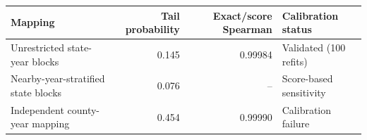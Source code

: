 \begin{tabular}{lrrl}
\toprule
Mapping & Tail probability & Exact/score Spearman & Calibration status \\
\midrule
Unrestricted state-year blocks & 0.145 & 0.99984 & Validated (100 refits) \\
Nearby-year-stratified state blocks & 0.076 & -- & Score-based sensitivity \\
Independent county-year mapping & 0.454 & 0.99990 & Calibration failure \\
\bottomrule
\end{tabular}
